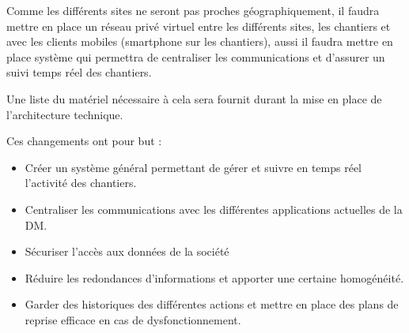 Comme les différents sites ne seront pas proches géographiquement, il faudra mettre en place un réseau privé virtuel entre les différents sites, les chantiers et avec les clients mobiles (smartphone sur les chantiers), aussi il faudra mettre en place système qui permettra de centraliser les communications et d'assurer un suivi temps réel des chantiers.


Une liste du matériel nécessaire à cela sera fournit durant la mise en place de l'architecture technique.


Ces changements ont pour but :
        \begin{itemize}
                \item Créer un système général permettant de gérer et suivre en temps réel l'activité des chantiers.
                \item Centraliser les communications avec les différentes applications actuelles de la DM.
                \item Sécuriser l'accès aux données de la société
                \item Réduire les redondances d'informations et apporter une certaine homogénéité.
                \item Garder des historiques des différentes actions et mettre en place des plans de reprise efficace en cas de dysfonctionnement.
        \end{itemize}


